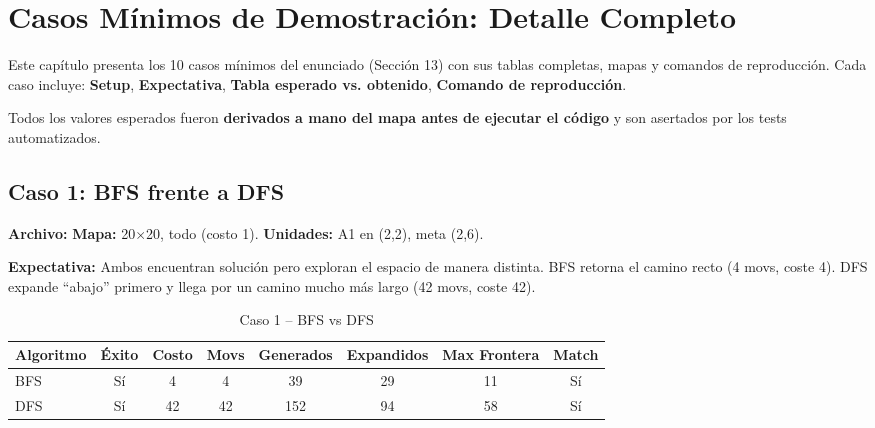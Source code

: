 \chapter{Casos Mínimos de Demostración: Detalle Completo}
\label{ch:casos-demo}

Este capítulo presenta los 10 casos mínimos del enunciado (Sección 13) con sus tablas
completas, mapas y comandos de reproducción. Cada caso incluye: \textbf{Setup}, \textbf{Expectativa},
\textbf{Tabla esperado vs. obtenido}, \textbf{Comando de reproducción}.

Todos los valores esperados fueron \textbf{derivados a mano del mapa antes de ejecutar el código}
y son asertados por los tests automatizados.






\section{Caso 1: BFS frente a DFS}
\label{sec:caso1-detalle}

\textbf{Archivo:} 
\textbf{Mapa:} 20$\times$20, todo  (costo 1).
\textbf{Unidades:} A1 en (2,2), meta (2,6).

\textbf{Expectativa:} Ambos encuentran solución pero exploran el espacio de manera distinta.
BFS retorna el camino recto (4 movs, coste 4). DFS expande ``abajo'' primero y llega por un
camino mucho más largo (42 movs, coste 42).

\begin{table}[H]
\centering
\caption{Caso 1 -- BFS vs DFS}
\begin{tabular}{lccccccc}
\toprule
Algoritmo & Éxito & Costo & Movs & Generados & Expandidos & Max Frontera & Match \\
\midrule
BFS & Sí & 4 & 4 & 39 & 29 & 11 & Sí \\
DFS & Sí & 42 & 42 & 152 & 94 & 58 & Sí \\
\bottomrule
\end{tabular}
\end{table}

